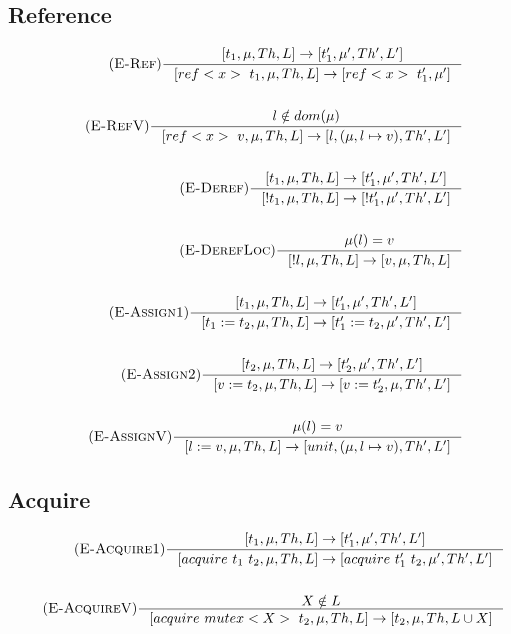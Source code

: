 \documentclass[12pt]{article}
\begin{document}
\subsection{Reference}
\begin{align*}
    \tag {\textsc{E-Ref}}
    \inference[]{[t_1,\mu,Th,L]->[t_1',\mu ',Th', L']}{[ref<x>~t_1,\mu,Th,L]-> [ref<x>~t_1',\mu']}
    \\
    \\
    \tag {\textsc{E-RefV}}
    \inference[]{l\notin dom(\mu)}{[ref<x>~v,\mu,Th,L] -> [l,(\mu,l\mapsto v),Th', L']} 
    \\
    \\
    \tag {\textsc{E-Deref}}
    \inference[]{[t_1,\mu,Th,L]->[t_1',\mu',Th', L']}{[!t_1,\mu,Th,L] -> [!t_1',\mu',Th', L']}
    \\
    \\
    \tag {\textsc{E-DerefLoc}}
    \inference[]{\mu(l)=v}{[!l,\mu,Th,L] -> [v,\mu,Th,L]}
    \\
    \\
    \tag {\textsc{E-Assign1}}
    \inference[]{[t_1,\mu,Th,L]->[t_1',\mu',Th', L']}{[t_1:=t_2,\mu,Th,L] -> [t_1':=t_2,\mu',Th', L']}
    \\
    \\
    \tag {\textsc{E-Assign2}}
    \inference[]{[t_2,\mu,Th,L]->[t_2',\mu',Th', L']}{[v:=t_2,\mu,Th,L ]-> [v:=t_2',\mu,Th',L']}
    \\
    \\
    \tag {\textsc{E-AssignV}}
    \inference[]{\mu(l)=v}{[l:=v,\mu,Th,L] -> [unit,(\mu,l\mapsto v),Th',L']}
\end{align*}

\subsection{Acquire}
\begin{align*}
    \tag{\textsc{E-Acquire1}}
    \inference[]{[t_1,\mu,Th,L]->[t_1',\mu',Th', L']}{[acquire~t_1~t_2,\mu,Th,L] -> [acquire~t_1'~t_2,\mu',Th',L']}
    \\
    \\
    \tag{\textsc{E-AcquireV}}
    \inference[]{X\notin L}{[acquire~mutex<X>~t_2,\mu,Th,L]-> [t_2,\mu,Th,L\cup{X}]}
    \end{align*}
\end{document}
